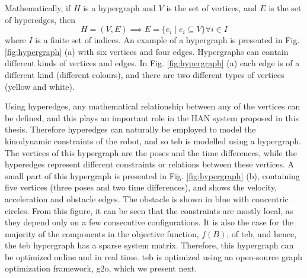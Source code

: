 Mathematically, if $H$ is a hypergraph and $V$ is the set of vertices, and $E$ is the set of hyperedges, then
\begin{equation}
    H = (V, E) \implies E = \{e_i \mid e_i \subseteq V\} \forall i \in I
\end{equation}
where $I$ is a finite set of indices. An example of a hypergraph is presented in Fig. \ref{fig:hypergraph} (a) with six vertices and four edges. Hypergraphs can contain different kinds of vertices and edges. In Fig. \ref{fig:hypergraph} (a) each edge is of a different kind (different colours), and there are two different types of vertices (yellow and white). 

Using hyperedges, any mathematical relationship between any of the vertices can be defined, and this plays an important role in the HAN system proposed in this thesis. Therefore hyperedges can naturally be employed to model the kinodynamic constraints of the robot, and so \acrshort{teb} is modelled using a hypergraph. The vertices of this hypergraph are the poses and the time differences, while the hyperedges represent different constraints or relations between these vertices. A small part of this hypergraph is presented in Fig. \ref{fig:hypergraph} (b), containing five vertices (three poses and two time differences), and shows the velocity, acceleration and obstacle edges. The obstacle is shown in blue with concentric circles. From this figure, it can be seen that the constraints are mostly local, as they depend only on a few consecutive configurations. It is also the case for the majority of the components in the objective function, $f(B)$, of \acrshort{teb}, and hence, the \acrshort{teb} hypergraph has a sparse system matrix. Therefore, this hypergraph can be optimized online and in real time. \acrshort{teb} is optimized using an open-source graph optimization framework, g2o, which we present next. 


